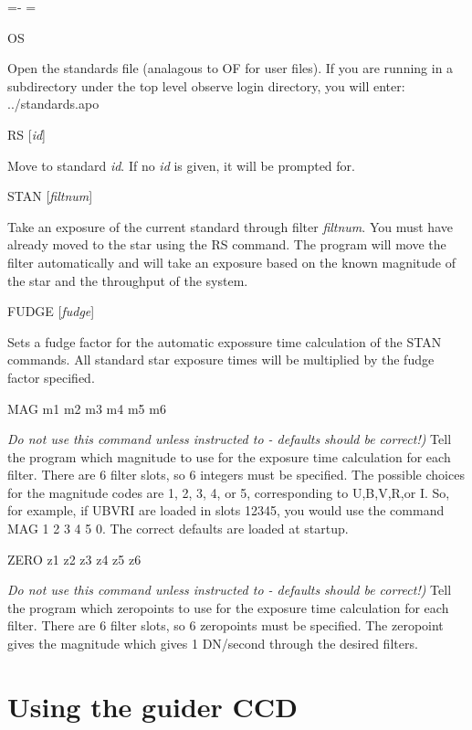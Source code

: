 \documentclass[10pt]{report}
\renewcommand{\[}{\begin{eqnarray}}
\renewcommand{\]}{\end{eqnarray}}
\newenvironment{hanging}{
	\begin{list}{}{
		\labelsep=0pt
		\labelwidth=0pt
		\listparindent=0pt
		\itemindent=-\leftmargini
		\leftmargin=\leftmargini
	}
}{
	\end{list}
}
\begin{document}
\begin{hanging}

\item{OS}

Open the standards file (analagous to OF for user files). 
If you are running in a subdirectory under the
top level observe login directory, you will enter: ../standards.apo

\item{RS [{\it id}]}

Move to standard {\it id}. If no {\it id} is given, it will be prompted for.

\item{STAN [\textit{filtnum}]}

Take an exposure of the current standard through filter \textit{filtnum}. You
must have already moved to the star using the RS command. The program will move
the filter automatically and will take an exposure based on the known
magnitude of the star and the throughput of the system.

\item{FUDGE [\textit{fudge}]}

Sets a fudge factor for the automatic expossure time calculation of the STAN
commands. All standard star exposure times will be multiplied by the fudge
factor specified. 

\item{MAG m1 m2 m3 m4 m5 m6}

\textit{Do not use this command unless instructed to - defaults should be
correct!)}
Tell the program which magnitude to use for the exposure time calculation
for each filter. There are 6 filter slots, so 6 integers must be specified.
The possible choices for the magnitude codes are 1, 2, 3, 4, or 5, corresponding
to U,B,V,R,or I. So, for example, if UBVRI are loaded in slots 12345, you
would use the command MAG 1 2 3 4 5 0. The correct defaults are loaded at
startup.

\item{ZERO z1 z2 z3 z4 z5 z6}

\textit{Do not use this command unless instructed to - defaults should be
correct!)}
Tell the program which zeropoints to use for the exposure time calculation
for each filter. There are 6 filter slots, so 6 zeropoints must be specified.
The zeropoint gives the magnitude which gives 1 DN/second through the
desired filters.

\end{hanging}

\chapter{Using the guider CCD}
\end{document}
